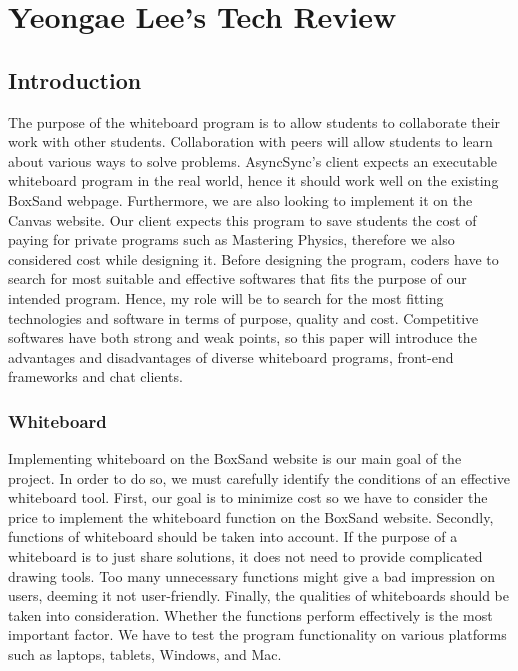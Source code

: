 \documentclass[10pt]{article}
\begin{document}
\section{Yeongae Lee's Tech Review}
        \subsection{Introduction}
            The purpose of the whiteboard program is to allow students to collaborate their work with other students. Collaboration with peers will allow students to learn about various ways to solve problems. AsyncSync’s client expects an executable whiteboard program in the real world, hence it should work well on the existing BoxSand webpage. Furthermore, we are also looking to implement it on the Canvas website. Our client expects this program to save students the cost of paying for private programs such as Mastering Physics, therefore we also considered cost while designing it. Before designing the program, coders have to search for most suitable and effective softwares that fits the purpose of our intended program. Hence, my role will be to search for the most fitting technologies and software in terms of purpose, quality and cost. Competitive softwares have both strong and weak points, so this paper will introduce the advantages and disadvantages of diverse whiteboard programs, front-end frameworks and chat clients. 
        
        \subsubsection{Whiteboard}
            Implementing whiteboard on the BoxSand website is our main goal of the project. In order to do so, we must carefully identify the conditions of an effective whiteboard tool. First, our goal is to minimize cost so we have to consider the price to implement the whiteboard function on the BoxSand website. Secondly, functions of whiteboard should be taken into account. If the purpose of a whiteboard is to just share solutions, it does not need to provide complicated drawing tools. Too many unnecessary functions might give a bad impression on users, deeming it not user-friendly. Finally, the qualities of whiteboards should be taken into consideration. Whether the functions perform effectively is the most important factor. We have to test the program functionality on various platforms such as laptops, tablets, Windows, and Mac. \cite{Online Whiteboards}
        
\end{document}
